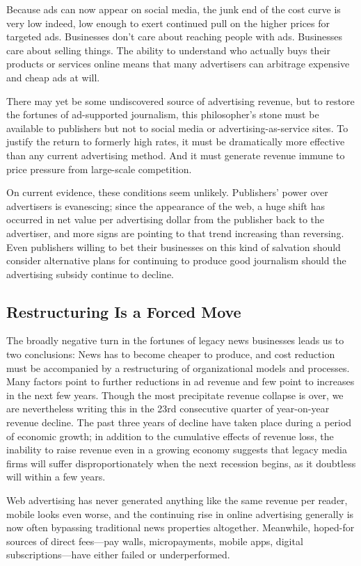 Because ads can now appear on social media, the junk end of the cost curve is
very low indeed, low enough to exert continued pull on the higher prices for
targeted ads. Businesses don’t care about reaching people with ads. Businesses
care about selling things. The ability to understand who actually buys their products
or services online means that many advertisers can arbitrage expensive and
cheap ads at will.

There may yet be some undiscovered source of advertising revenue, but to restore
the fortunes of ad-supported journalism, this philosopher’s stone must be available
to publishers but not to social media or advertising-as-service sites. To justify
the return to formerly high rates, it must be dramatically more effective than any
current advertising method. And it must generate revenue immune to price pressure
from large-scale competition.

On current evidence, these conditions seem unlikely. Publishers’ power over
advertisers is evanescing; since the appearance of the web, a huge shift has occurred
in net value per advertising dollar from the publisher back to the advertiser, and
more signs are pointing to that trend increasing than reversing. Even publishers
willing to bet their businesses on this kind of salvation should consider alternative
plans for continuing to produce good journalism should the advertising subsidy
continue to decline.

\subsection{Restructuring Is a Forced Move}
The broadly negative turn in the fortunes of legacy news businesses leads us to
two conclusions: News has to become cheaper to produce, and cost reduction
must be accompanied by a restructuring of organizational models and processes.
Many factors point to further reductions in ad revenue and few point to increases
in the next few years. Though the most precipitate revenue collapse is over, we
are nevertheless writing this in the 23rd consecutive quarter of year-on-year
revenue decline. The past three years of decline have taken place during a period
of economic growth; in addition to the cumulative effects of revenue loss, the
inability to raise revenue even in a growing economy suggests that legacy media
firms will suffer disproportionately when the next recession begins, as it doubtless
will within a few years.

Web advertising has never generated anything like the same revenue per reader,
mobile looks even worse, and the continuing rise in online advertising generally
is now often bypassing traditional news properties altogether. Meanwhile,
hoped-for sources of direct fees—pay walls, micropayments, mobile apps, digital
subscriptions—have either failed or underperformed.

